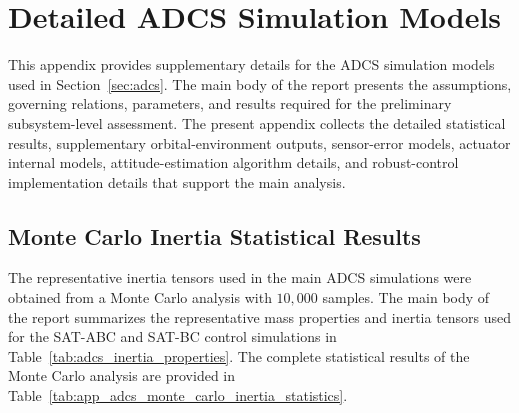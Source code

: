 \appendix


\chapter{Detailed ADCS Simulation Models}
\label{app:adcs_detailed_models}
This appendix provides supplementary details for the ADCS simulation models used in Section~\ref{sec:adcs}. The main body of the report presents the assumptions, governing relations, parameters, and results required for the preliminary subsystem-level assessment. The present appendix collects the detailed statistical results, supplementary orbital-environment outputs, sensor-error models, actuator internal models, attitude-estimation algorithm details, and robust-control implementation details that support the main analysis.

\section{Monte Carlo Inertia Statistical Results}
\label{app:adcs_monte_carlo_inertia_statistics}

The representative inertia tensors used in the main ADCS simulations were obtained from a Monte Carlo analysis with \(10{,}000\) samples. The main body of the report summarizes the representative mass properties and inertia tensors used for the SAT-ABC and SAT-BC control simulations in Table~\ref{tab:adcs_inertia_properties}. The complete statistical results of the Monte Carlo analysis are provided in Table~\ref{tab:app_adcs_monte_carlo_inertia_statistics}.

